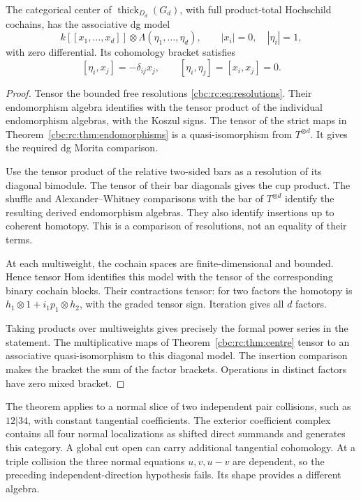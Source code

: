 \begin{theorem}\label{cbc:rc:thm:normal-crossing}
The categorical center of \(\operatorname{thick}_{D_d}(G_d)\), with full
product-total Hochschild cochains, has the associative dg model
\[
 k[[x_1,\ldots,x_d]]\otimes\Lambda(\eta_1,\ldots,\eta_d),
 \qquad |x_i|=0,\quad |\eta_i|=1,
\]
with zero differential.  Its cohomology bracket satisfies
\[
 [\eta_i,x_j]=-\delta_{ij}x_j,\qquad
 [\eta_i,\eta_j]=[x_i,x_j]=0.
\]
\end{theorem}
\begin{proof}
Tensor the bounded free resolutions \eqref{cbc:rc:eq:resolutions}.
Their endomorphism algebra identifies with the tensor product of the
individual endomorphism algebras, with the Koszul signs.
The tensor of the strict maps in Theorem~\ref{cbc:rc:thm:endomorphisms}
is a quasi-isomorphism from \(T^{\otimes d}\).  It gives the required
dg Morita comparison.

Use the tensor product of the relative two-sided bars as a resolution
of its diagonal bimodule.  The tensor of their bar diagonals gives the
cup product.  The shuffle and Alexander--Whitney comparisons with the
bar of \(T^{\otimes d}\) identify the resulting derived endomorphism
algebras. They also identify insertions up to coherent homotopy.
This is a comparison of resolutions, not an equality of their terms.

At each multiweight, the cochain spaces are finite-dimensional and
bounded.  Hence tensor Hom identifies this model with the tensor of
the corresponding binary cochain blocks.
Their contractions tensor: for two factors the homotopy is
\(h_1\otimes1+i_1p_1\otimes h_2\), with the graded tensor sign.
Iteration gives all \(d\) factors.

Taking products over multiweights gives precisely the formal power
series in the statement.  The multiplicative maps of
Theorem~\ref{cbc:rc:thm:centre} tensor to an associative quasi-isomorphism
to this diagonal model.
The insertion comparison makes the bracket the sum of the factor
brackets.  Operations in distinct factors have zero mixed bracket.
\end{proof}

The theorem applies to a normal slice of two independent pair
collisions, such as \(12|34\), with constant tangential coefficients.
The exterior coefficient complex contains all four normal
localizations as shifted direct summands and generates this category.
A global cut open can carry additional tangential cohomology.
At a triple collision the three normal equations \(u,v,u-v\) are
dependent, so the preceding independent-direction hypothesis fails.
Its shape provides a different algebra.


